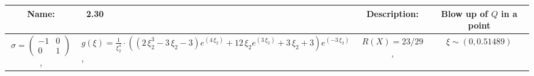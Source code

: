 {\setlength{\parindent}{0pt}
\newpage
\begin{landscape}
%
%
%
%
%
%
%
%
%
%
%
%
%
\begin{tabularx}{\linewidth}{clcc}
\toprule
\midrule
\textbf{Name:} & \ 2.30 \hspace{0.3\linewidth} & \textbf{Description:} & Blow up of $Q$ in a point\\
\midrule
{\small $ \sigma = \begin{pmatrix} -1 & 0 \\ 0 & 1 \end{pmatrix}$ }, & \( g(\xi) = \frac{1}{\xi_{2}^{4}}\cdot\left({\left(2 \, \xi_{2}^{3} - 3 \, \xi_{2} - 3\right)} e^{\left(4 \, \xi_{2}\right)} + 12 \, \xi_{2} e^{\left(3 \, \xi_{2}\right)} + 3 \, \xi_{2} + 3\right) e^{\left(-3 \, \xi_{2}\right)} \), & $ R(X) = 23/29$ , & $\xi \sim (0,0.51489)$
\end{tabularx}
\begin{figure}[H]
\centering


\end{figure}
\end{landscape}}
